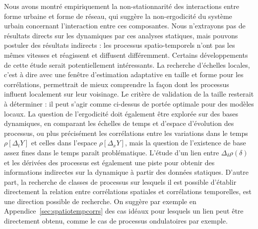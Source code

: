 {Nous avons montré empiriquement la non-stationnarité des interactions entre forme urbaine et forme de réseau, qui suggère la non-ergodicité du système urbain concernant l'interaction entre ces composantes. Nous n'extrayons pas de résultats directs sur les dynamiques par ces analyses statiques, mais pouvons postuler des résultats indirects : les processus spatio-temporels n'ont pas les mêmes vitesses et réagissent et diffusent différemment. Certains développements de cette étude serait potentiellement intéressants. La recherche d'échelles locales, c'est à dire avec une fenêtre d'estimation adaptative en taille et forme pour les corrélations, permettrait de mieux comprendre la façon dont les processus influent localement sur leur voisinage. Le critère de validation de la taille resterait à déterminer : il peut s'agir comme ci-dessus de portée optimale pour des modèles locaux. La question de l'ergodicité doit également être explorée sur des bases dynamiques, en comparant les échelles de temps et d'espace d'évolution des processus, ou plus précisément les corrélations entre les variations dans le temps $\rho\left[\Delta_t Y\right]$ et celles dans l'espace $\rho\left[\Delta_x Y\right]$, mais la question de l'existence de base assez fines dans le temps paraît problématique. L'étude d'un lien entre $\Delta_{\delta}\rho (\delta)$ et les dérivées des processus est également une piste pour obtenir des informations indirectes sur la dynamique à partir des données statiques. D'autre part, la recherche de classes de processus sur lesquels il est possible d'établir directement la relation entre corrélations spatiales et corrélations temporelles, est une direction possible de recherche. On suggère par exemple en Appendice~\ref{sec:spatiotempcorrs} des cas idéaux pour lesquels un lien peut être directement obtenu, comme le cas de processus ondulatoires par exemple.
}








\stars




